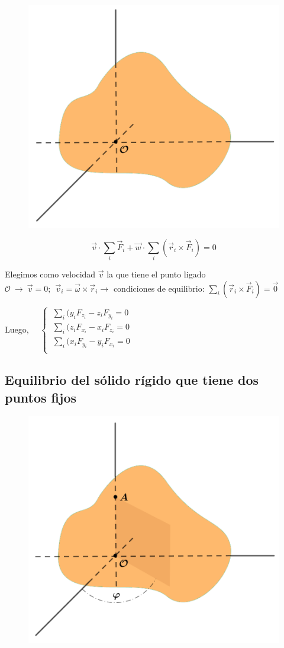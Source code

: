 \vspace{-5mm} %
  \begin{figure}[H]
	\centering
	\includegraphics[width=.4\textwidth]{imagenes/imagenes06/T06IM06.png}
\end{figure}
 
 $$\vec v \cdot \displaystyle \sum_i \vec F_i + \vec w\cdot \sum_i(\vec r_i \times \vec F_i)=0$$
 
 Elegimos como velocidad $\vec v$ la que tiene el punto ligado $\mathcal O \ \to \ \vec v=0;\ \ \vec v_i=\vec \omega \times \vec r_i \to $ condiciones de equilibrio: $\displaystyle \sum_i (\vec r_i \times \vec F_i)=\vec 0$
 
 Luego, $\quad \begin{cases} 
 \ \displaystyle \sum_i (y_iF_{z_i}-z_iF_{y_i}=0\\
  \ \displaystyle \sum_i (z_iF_{x_i}-x_iF_{z_i}=0\\
   \ \displaystyle \sum_i (x_iF_{y_i}-y_iF_{x_i}=0\\	
 \end{cases}$


  \subsection{Equilibrio del sólido rígido que tiene dos puntos fijos}
 
\vspace{-5mm} %
   \begin{figure}[H]
	\centering
	\includegraphics[width=.6\textwidth]{imagenes/imagenes06/T06IM07.png}
\end{figure}


